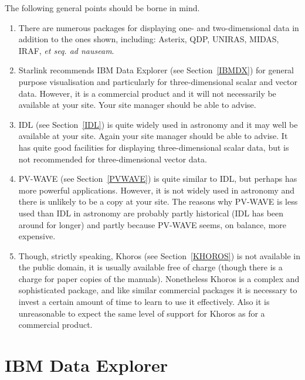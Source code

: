 The following general points should be borne in mind.

\begin{enumerate}

  \item There are numerous packages for displaying one- and
   two-dimensional data in addition to the ones shown, including:
   Asterix, QDP, UNIRAS, MIDAS, IRAF, {\it et seq. ad nauseam}.

  \item Starlink recommends IBM Data Explorer (see Section~\ref{IBMDX})
   for general purpose visualisation and particularly for
   three-dimensional scalar and vector data. However, it is a
   commercial product and it will not necessarily be available at your
   site. Your site manager should be able to advise.

  \item IDL (see Section~\ref{IDL}) is quite widely used in astronomy
   and it may well be available at your site. Again your site manager
   should be able to advise. It has quite good facilities for displaying
   three-dimensional scalar data, but is not recommended for
   three-dimensional vector data.

  \item PV-WAVE (see Section~\ref{PVWAVE}) is quite similar to IDL, but
   perhaps has more powerful applications. However, it is not widely
   used in astronomy and there is unlikely to be a copy at your site.
   The reasons why PV-WAVE is less used than IDL in astronomy are
   probably partly historical (IDL has been around for longer) and
   partly because PV-WAVE seems, on balance, more expensive.

  \item Though, strictly speaking, Khoros (see Section~\ref{KHOROS}) is 
   not available in the public domain, it is usually available free of
   charge (though there is a charge for paper copies of the manuals).
   Nonetheless Khoros is a complex and sophisticated package, and like
   similar commercial packages it is necessary to invest a certain
   amount of time to learn to use it effectively. Also it is
   unreasonable to expect the same level of support for Khoros as for
   a commercial product.

\end{enumerate}


\section{IBM Data Explorer \label{IBMDX}  }

